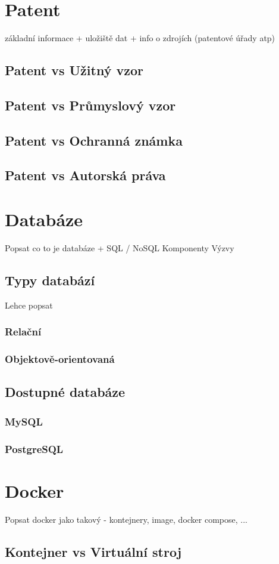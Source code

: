\chapter{Patent}
základní informace + uložiště dat + info o zdrojích (patentové úřady atp) \newline
\cite{WikipediaPatent}
\section{Patent vs Užitný vzor}
\section{Patent vs Průmyslový vzor}
\section{Patent vs Ochranná známka}
\section{Patent vs Autorská práva}



\chapter{Databáze}
Popsat co to je databáze + SQL / NoSQL\newline
Komponenty \newline
Výzvy
\section{Typy databází}
Lehce popsat
\subsection{Relační}
\subsection{Objektově-orientovaná}
\section{Dostupné databáze}
\subsection{MySQL}
\subsection{PostgreSQL}


\chapter{Docker}
Popsat docker jako takový - kontejnery, image, docker compose, ...\newline
\section{Kontejner vs Virtuální stroj}